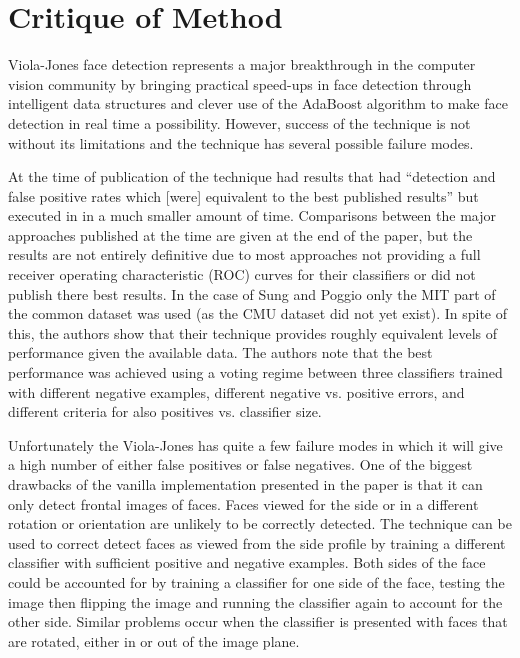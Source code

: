 \documentclass[conference]{IEEEtran}
\begin{document}
\section{Critique of Method} \label{sec:critique-of-method}
Viola-Jones face detection represents a major breakthrough in the computer vision community by bringing practical speed-ups in face detection through intelligent data structures and clever use of the AdaBoost algorithm to make face detection in real time a possibility. However, success of the technique is not without its limitations and the technique has several possible failure modes.

At the time of publication of the technique had results that had ``detection and false positive rates which [were] equivalent to the best published results'' \cite{viola2004robust} but executed in in a much smaller amount of time. Comparisons between the major approaches published at the time are given at the end of the paper, but the results are not entirely definitive due to most approaches not providing a full receiver operating characteristic (ROC) curves for their classifiers or did not publish there best results. In the case of Sung and Poggio \cite{sung1998example} only the MIT part of the common dataset was used (as the CMU dataset did not yet exist). In spite of this, the authors show that their technique provides roughly equivalent levels of performance given the available data. The authors note that the best performance was achieved using a voting regime between three classifiers trained with different negative examples, different negative vs. positive errors, and different criteria for also positives vs. classifier size.

Unfortunately the Viola-Jones has quite a few failure modes in which it will give a high number of either false positives or false negatives. One of the biggest drawbacks of the vanilla implementation presented in the paper is that it can only detect frontal images of faces. Faces viewed for the side or in a different rotation or orientation are unlikely to be correctly detected. The technique can be used to correct detect faces as viewed from the side profile by training a different classifier with sufficient positive and negative examples. Both sides of the face could be accounted for by training a classifier for one side of the face, testing the image then flipping the image and running the classifier again to account for the other side. Similar problems occur when the classifier is presented with faces that are rotated, either in or out of the image plane. 
\end{document}
